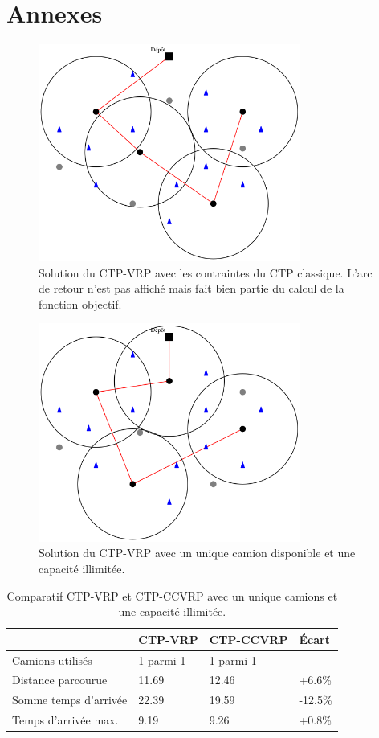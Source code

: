 \documentclass[5p,authoryear]{elsarticle}
\begin{document}
\section*{Annexes}
\begin{figure}[p] \centering
	\includegraphics[width=3.4in]{figures/ctp_un_camion}
	\caption[]{Solution du CTP-VRP avec les contraintes du CTP classique. L'arc de retour n'est pas affiché mais fait bien partie du calcul de la fonction objectif.} \label{ctp_un_camion} 
\end{figure}

\begin{figure}[p]\centering
	\centerline{\includegraphics[width=3.4in]{figures/ctpccvrp_un_camion}}
	\caption[]{Solution du CTP-VRP avec un unique camion disponible et une capacité illimitée.} \label{ctpccvrp_un_camion}
\end{figure}

\begin{table}[p] \centering \begin{tabular}{@{\small}llll@{}} \toprule %
 & {\footnotesize CTP-VRP} &  {\footnotesize CTP-CCVRP} & Écart \\ \midrule
Camions utilisés & 1 parmi 1 & 1 parmi 1 &  \\
Distance parcourue & 11.69 & 12.46 & +6.6\% \\
Somme temps d'arrivée & 22.39 & 19.59 & -12.5\% \\
Temps d'arrivée max. & 9.19 & 9.26 & +0.8\% \\ \bottomrule
\end{tabular} \caption{Comparatif CTP-VRP et CTP-CCVRP avec un unique camions et une capacité illimitée.} \label{table_un_camion}
\end{table}
\end{document}

